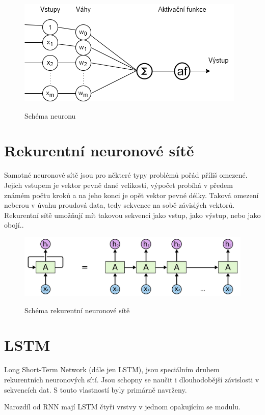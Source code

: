 \begin{figure}[h]\centering
    \centering
    \includegraphics[width=0.6\linewidth]{obrazky/neuronSchema.png}\\[1pt]  
    \caption{Schéma neuronu}    
    \label{obrazekSchemaNeuronoveSite}
\end{figure}


\section{Rekurentní neuronové sítě}
Samotné neuronové sítě jsou pro některé typy problémů pořád příliš omezené.
Jejich vstupem je vektor pevně dané velikosti, 
výpočet probíhá v předem známém počtu kroků a na jeho konci je opět vektor pevné délky.
Taková omezení neberou v úvahu proudová data, tedy sekvence na sobě závislých vektorů.
Rekurentní sítě umožňují mít takovou sekvenci jako vstup, jako výstup, nebo jako obojí.\cite{Karpathy_RNNs}.

\begin{figure}[h]\centering
    \centering
    \includegraphics[width=0.6\linewidth]{obrazky/RNNSchema.png}\\[1pt]  
    \caption{Schéma rekurentní neuronové sítě\cite{colah_lstm}}    
    \label{obrazekSchemaRekurentniNeuronoveSite}
\end{figure}

\section{LSTM}
\label{lstmTeorie}
Long Short-Term Network (dále jen LSTM), jsou speciálním druhem rekurentních neuronových sítí.
Jsou schopny se naučit i dlouhodobější závislosti v sekvencích dat.
S touto vlastností byly primárně navrženy.\cite{colah_lstm}
\par
Narozdíl od RNN mají LSTM čtyři vrstvy v jednom opakujícím se modulu.


